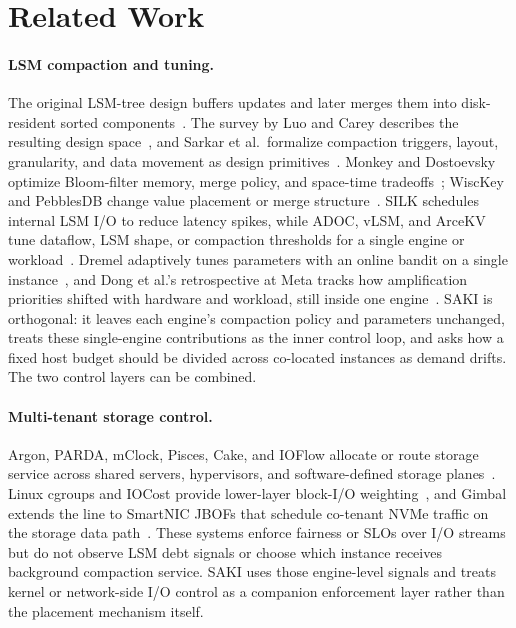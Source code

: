 \section{Related Work}

\paragraph{LSM compaction and tuning.}
The original LSM-tree design buffers updates and later merges them into
disk-resident sorted components~\cite{oneil1996lsm}. The survey by Luo and
Carey describes the resulting design space~\cite{luo2020lsmsurvey}, and
Sarkar et al.\ formalize compaction triggers, layout, granularity, and data
movement as design primitives~\cite{sarkar2021lsmspace}. Monkey and
Dostoevsky optimize Bloom-filter memory, merge policy, and space-time
tradeoffs~\cite{dayan2017monkey,dayan2018dostoevsky}; WiscKey and PebblesDB
change value placement or merge structure~\cite{lu2016wisckey,raju2017pebblesdb}.
SILK schedules internal LSM I/O to reduce latency spikes, while ADOC, vLSM, and
ArceKV tune dataflow, LSM shape, or compaction thresholds for a single engine
or workload~\cite{balmau2019silk,yu2023adoc,xanthakis2024vlsm,liu2026arcekv}.
Dremel adaptively tunes \rocksdb parameters with an online bandit on a single
instance~\cite{zhao2022dremel}, and Dong et al.'s \rocksdb retrospective at
Meta tracks how amplification priorities shifted with hardware and workload,
still inside one engine~\cite{dong2021rocksdbevolution}. SAKI is orthogonal:
it leaves each engine's compaction policy and parameters unchanged, treats
these single-engine contributions as the inner control loop, and asks how a
fixed host budget should be divided across co-located instances as demand
drifts. The two control layers can be combined.

\paragraph{Multi-tenant storage control.}
Argon, PARDA, mClock, Pisces, Cake, and IOFlow allocate or route storage
service across shared servers, hypervisors, and software-defined storage
planes~\cite{wachs2007argon,gulati2009parda,gulati2010mclock,shue2012pisces,
wang2012cake,thereska2013ioflow}. Linux cgroups and IOCost provide lower-layer
block-I/O weighting~\cite{linux_cgroup_v2,heo2022iocost}, and Gimbal extends
the line to SmartNIC JBOFs that schedule co-tenant NVMe traffic on the
storage data path~\cite{min2021gimbal}. These systems enforce fairness or
SLOs over I/O streams but do not observe LSM debt signals or choose which
\rocksdb instance receives background compaction service. SAKI uses those
engine-level signals and treats kernel or network-side I/O control as a
companion enforcement layer rather than the placement mechanism itself.

